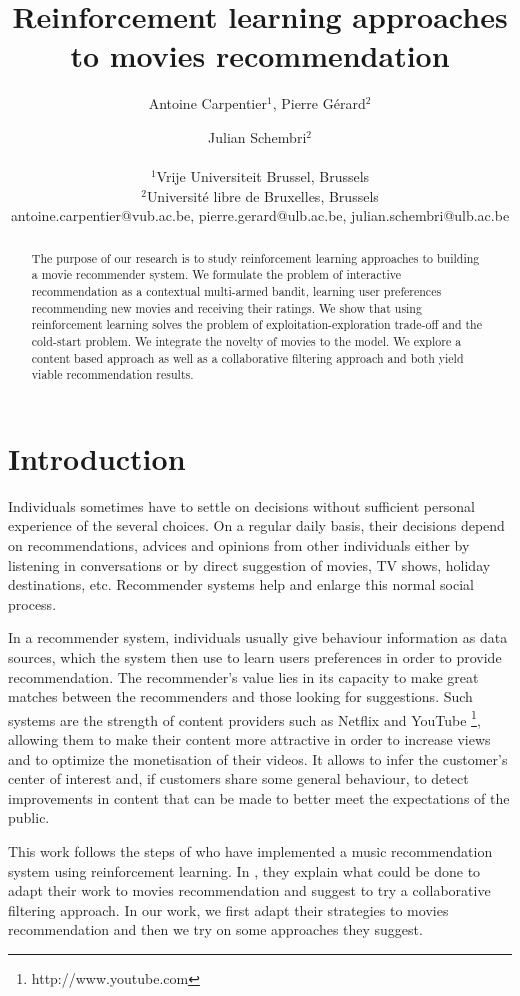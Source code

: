 \documentclass[letterpaper]{article}
\title{Reinforcement learning approaches to movies recommendation}
\author{Antoine Carpentier$^{1}$, Pierre Gérard$^{2}$ \and Julian Schembri$^2$ \\
\mbox{}\\
$^1$Vrije Universiteit Brussel, Brussels \\
$^2$Université libre de Bruxelles, Brussels \\
antoine.carpentier@vub.ac.be, pierre.gerard@ulb.ac.be, julian.schembri@ulb.ac.be}
\begin{document}
\maketitle

\begin{abstract}
  The purpose of our research is to study reinforcement learning approaches to building a movie recommender system. We formulate the problem of interactive recommendation as a contextual multi-armed bandit, learning user preferences recommending new movies and receiving their ratings. We show that using reinforcement learning solves the problem of exploitation-exploration trade-off and the cold-start problem. We integrate the novelty of movies to the model. We explore a content based approach as well as a collaborative filtering approach and both yield viable recommendation results.
\end{abstract}

\section{Introduction}


Individuals sometimes have to settle on decisions without sufficient personal experience of the several choices. On a regular daily basis, their decisions depend on recommendations, advices and opinions from other individuals either by listening in conversations or by direct suggestion of movies, TV shows, holiday destinations, etc. Recommender systems help and enlarge this normal social process.

In a recommender system, individuals usually give behaviour information as data sources, which the system then use to learn users preferences in order to provide recommendation. The recommender's value lies in its capacity to make great matches between the recommenders and those looking for suggestions. Such systems are the strength of content providers such as Netflix \cite{netflix-article-recommender} and YouTube \footnote{http://www.youtube.com}, allowing them to make their content more attractive in order to increase views and to optimize the monetisation of their videos. It allows to infer the customer's center of interest and, if customers share some general behaviour, to detect improvements in content that can be made to better meet the expectations of the public. 


This work follows the steps of \cite{main} who have implemented a music recommendation system using reinforcement learning. In \cite{main}, they explain what could be done to adapt their work to movies recommendation and suggest to try a collaborative filtering approach. In our work, we first adapt their strategies to movies recommendation and then we try on some approaches they suggest.
\end{document}
